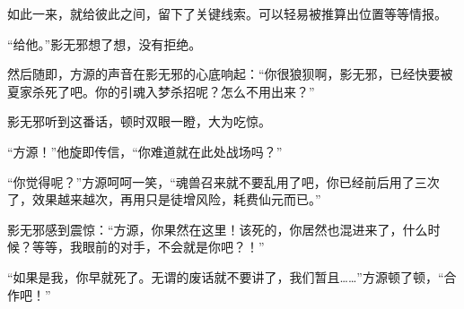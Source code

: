 \begin{this_body}
如此一来，就给彼此之间，留下了关键线索。可以轻易被推算出位置等等情报。

“给他。”影无邪想了想，没有拒绝。

然后随即，方源的声音在影无邪的心底响起：“你很狼狈啊，影无邪，已经快要被夏家杀死了吧。你的引魂入梦杀招呢？怎么不用出来？”

影无邪听到这番话，顿时双眼一瞪，大为吃惊。

“方源！”他旋即传信，“你难道就在此处战场吗？”

“你觉得呢？”方源呵呵一笑，“魂兽召来就不要乱用了吧，你已经前后用了三次了，效果越来越次，再用只是徒增风险，耗费仙元而已。”

影无邪感到震惊：“方源，你果然在这里！该死的，你居然也混进来了，什么时候？等等，我眼前的对手，不会就是你吧？！”

“如果是我，你早就死了。无谓的废话就不要讲了，我们暂且……”方源顿了顿，“合作吧！”

\end{this_body}


